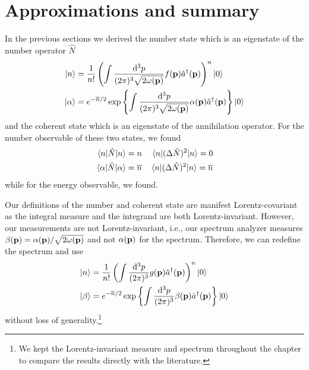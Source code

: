 \section{Approximations and summary}

In the previous sections we derived the number state which is an eigenstate of the number operator $\hat{N}$
\begin{align}
	\ket{n}
	&=
	\frac{1}{n!}
	\left(
		\int\frac{\dd[3]{p}}{(2\pi)^3\sqrt{2\omega(\vb{p})}}
		f(\vb{p})
		\hat{a}^\dagger(\vb{p})
	\right)^n
	\ket{0}
	\\
	\ket{\alpha}
	&=
	e^{-\overline{n}/2}
	\exp\left\{
		\int\frac{\dd[3]{p}}{(2\pi)^3\sqrt{2\omega(\vb{p})}}
		\alpha(\vb{p})
		\hat{a}^\dagger(\vb{p})
	\right\}
	\ket{0}
\end{align}
and the coherent state which is an eigenstate of the annihilation operator.
For the number observable of these two states, we found
\begin{align}
	\expval{\hat{N}}{n}
	=
	n
	&&
	\expval{(\Delta\hat{N})^2}{n}
	=
	0
	\\
	\expval{\hat{N}}{\alpha}
	=
	\overline{n}
	&&
	\expval{(\Delta\hat{N})^2}{n}
	=
	\overline{n}
\end{align}
while for the energy observable, we found.

Our definitions of the number and coherent state are manifest Lorentz-covariant as the integral measure and the integrand are both Lorentz-invariant.
However, our measurements are not Lorentz-invariant, i.e., our spectrum analyzer measures $\beta(\vb{p})=\alpha(\vb{p})/\sqrt{2\omega(\vb{p})}$ and not $\alpha(\vb{p})$ for the spectrum.
Therefore, we can redefine the spectrum and use
\begin{align}
	\ket{n}
	&=
	\frac{1}{n!}
	\left(
		\int\frac{\dd[3]{p}}{(2\pi)^3}
		g(\vb{p})
		\hat{a}^\dagger(\vb{p})
	\right)^n
	\ket{0}
	\\
	\ket{\beta}
	&=
	e^{-\overline{n}/2}
	\exp\left\{
		\int\frac{\dd[3]{p}}{(2\pi)^3}
		\beta(\vb{p})
		\hat{a}^\dagger(\vb{p})
	\right\}
	\ket{0}
\end{align}
without loss of generality.\footnote{We kept the Lorentz-invariant measure and spectrum throughout the chapter to compare the results directly with the literature.}